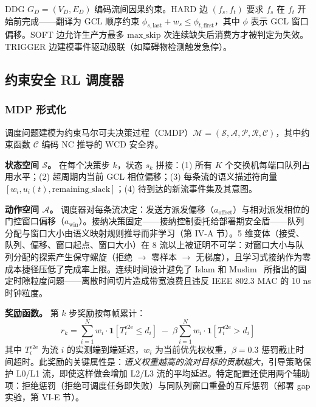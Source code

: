 \documentclass[UTF8]{ctexart}
\begin{document}
DDG $G_D = (V_D, E_D)$ 编码流间因果约束。HARD 边 $(f_s, f_t)$ 要求 $f_s$ 在 $f_t$ 开始前完成——翻译为 GCL 顺序约束 $\phi_{s,\text{last}} + w_s \leq \phi_{t,\text{first}}$，其中 $\phi$ 表示 GCL 窗口偏移。SOFT 边允许生产方最多 $\text{max\_skip}$ 次连续缺失后消费方才被判定为失效。TRIGGER 边建模事件驱动级联（如障碍物检测触发急停）。

\subsection{约束安全 RL 调度器}

\subsubsection{MDP 形式化}

调度问题建模为约束马尔可夫决策过程（CMDP）$\mathcal{M} = (\mathcal{S}, \mathcal{A}, \mathcal{P}, \mathcal{R}, \mathcal{C})$，其中约束函数 $\mathcal{C}$ 编码 NC 推导的 WCD 安全界。

\textbf{状态空间 $\mathcal{S}$。} 在每个决策步 $k$，状态 $s_k$ 拼接：(1) 所有 $K$ 个交换机每端口队列占用水平；(2) 超周期内当前 GCL 相位偏移；(3) 每条流的语义描述符向量 $[w_i, u_i(t), \text{remaining\_slack}]$；(4) 待到达的新流事件集及其意图。

\textbf{动作空间 $\mathcal{A}$。} 调度器对每条流决定：发送方派发偏移（$a_{\text{offset}}$）与相对派发相位的门控窗口偏移（$a_{\text{win}}$）。接纳决策固定——接纳控制委托给部署期安全盾——队列分配与窗口大小由语义映射规则推导而非学习（第 IV-A 节）。5 维变体（接受、队列、偏移、窗口起点、窗口大小）在 8 流以上被证明不可学：对窗口大小与队列分配的探索产生保守螺旋（拒绝 $\rightarrow$ 零样本 $\rightarrow$ 无梯度），且学习式接纳作为零成本捷径压低了完成率上限。连续时间设计避免了 Islam 和 Muslim~\cite{islam2024gcntd3} 所指出的固定时隙粒度问题——离散时间切片造成带宽浪费且违反 IEEE 802.3 MAC 的 10 ns 时钟粒度。

\textbf{奖励函数。} 第 $k$ 步奖励按每帧累计：
\begin{equation}
r_k = \sum_{i=1}^{N} w_i \cdot \mathbf{1}[T_i^{\text{e2e}} \leq d_i] \;-\; \beta \sum_{i=1}^{N} w_i \cdot \mathbf{1}[T_i^{\text{e2e}} > d_i]
\end{equation}
其中 $T_i^{\text{e2e}}$ 为流 $i$ 的实测端到端延迟，$w_i$ 为当前优先权权重，$\beta = 0.3$ 惩罚截止时间超时。此奖励的关键属性是：\textit{语义权重越高的流对目标的贡献越大}，引导策略保护 L0/L1 流，即使这样做会增加 L2/L3 流的平均延迟。特定配置还使用两个辅助项：拒绝惩罚（拒绝可调度任务即失败）与同队列窗口重叠的互斥惩罚（部署 gap 实验，第 VI-E 节）。
\end{document}
